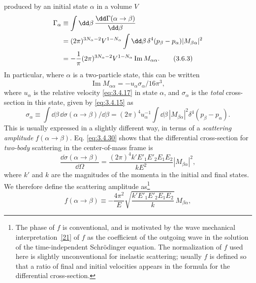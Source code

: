 produced by an initial state $\alpha$ in a volume $V$
\begin{align}
 \Gamma_\alpha&\equiv\int \dd\beta\,\frac{\dd\Gamma(\alpha\to\beta)}{\dd\beta}\notag\\
 &=(2\pi)^{3N_\alpha-2}V^{1-N_\alpha}
 \int \dd\beta\,\delta^4(p_\beta-p_\alpha)|M_{\beta\alpha}|^2\notag\\
 &=-\frac{1}{\pi}(2\pi)^{3N_\alpha-2}V^{1-N_\alpha}
 \operatorname{Im}M_{\alpha\alpha}.
 \tag{3.6.3}\label{eq:3.6.3}
\end{align}
In particular, where $\alpha$ is a two-particle state, this can be written
\begin{equation}
 \operatorname{Im}M_{\alpha\alpha}=-u_\alpha\sigma_\alpha/16\pi^3,
 \tag{3.6.4}\label{eq:3.6.4}
\end{equation}
where $u_\alpha$ is the relative velocity \eqref{eq:3.4.17} in state $\alpha$, and $\sigma_\alpha$ is the
\emph{total} cross-section in this state, given by \eqref{eq:3.4.15} as
\begin{equation}
 \sigma_\alpha\equiv\int \dd\beta\,\dd\sigma(\alpha\to\beta)/\dd\beta
 =(2\pi)^4u_\alpha^{-1}\int \dd\beta\,|M_{\beta\alpha}|^2
 \delta^4(p_\beta-p_\alpha).
 \tag{3.6.5}\label{eq:3.6.5}
\end{equation}
This is usually expressed in a slightly different way, in terms of a \emph{scattering amplitude}
$f(\alpha\to\beta)$. Eq. \eqref{eq:3.4.30} shows that the differential cross-section for \emph{two-body}
scattering in the center-of-mass frame is
\begin{equation}
 \frac{\dd\sigma(\alpha\to\beta)}{\dd\Omega}
 =\frac{(2\pi)^4k'E'_1E'_2E_1E_2}{kE^2}|M_{\beta\alpha}|^2,
 \tag{3.6.6}\label{eq:3.6.6}
\end{equation}
where $k'$ and $k$ are the magnitudes of the momenta in the initial and final states. We therefore
define the scattering amplitude as\footnote{The phase of $f$ is conventional, and is motivated by
the wave mechanical interpretation~\hyperref[ref:3.21]{[21]} of $f$ as the coefficient of the outgoing wave in the
solution of the time-independent Schrödinger equation. The normalization of $f$ used here is
slightly unconventional for inelastic scattering; usually $f$ is defined so that a ratio of final
and initial velocities appears in the formula for the differential cross-section.}
\begin{equation}
 f(\alpha\to\beta)\equiv-\frac{4\pi^2}{E}
 \sqrt{\frac{k'E'_1E'_2E_1E_2}{k}}\,M_{\beta\alpha},
 \tag{3.6.7}\label{eq:3.6.7}
\end{equation}
